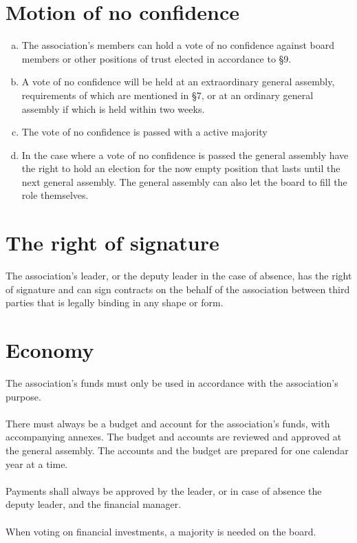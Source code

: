 \documentclass[12pt,a4paper,norsk]{article}
\begin{document}
\section{Motion of no confidence}
\begin{enumerate}[a)]
    \item The association's members can hold a vote of no confidence against board members or other positions of trust elected in accordance to §9.
    \item A vote of no confidence will be held at an extraordinary general assembly, requirements of which are mentioned in §7, or at an ordinary general assembly if which is held within two weeks.
    \item The vote of no confidence is passed with a  active majority
    \item In the case where a vote of no confidence is passed the general assembly have the right to hold an election for the now empty position that lasts until the next general assembly. The general assembly can also let the board to fill the role themselves.
\end{enumerate}



\section{The right of signature}

The association's leader, or the deputy leader in the case of absence, has the right of signature and can sign contracts on the behalf of the association  between third parties that is legally binding in any shape or form.


\section{Economy}

The association's funds must only be used in accordance with the association's purpose.
\\
\\
There must always be a budget and account for the association's funds, with accompanying annexes.
The budget and accounts are reviewed and approved at the general assembly. The accounts and the budget are prepared for one calendar year at a time.
\\
\\
Payments shall always be approved by the leader, or in case of absence the deputy leader, and the financial manager.
\\
\\
When voting on financial investments, a  majority is needed on the board.
\end{document}
